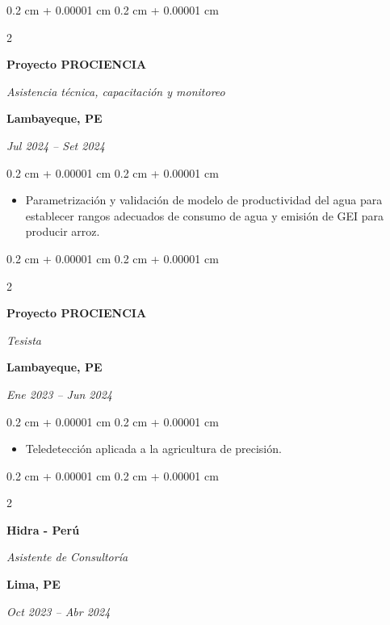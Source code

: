 \documentclass[10pt, letterpaper]{article}
\newenvironment{highlights}{
    \begin{itemize}[
        topsep=0.10 cm,
        parsep=0.10 cm,
        partopsep=0pt,
        itemsep=0pt,
        leftmargin=0.4 cm + 10pt
    ]
}{
    \end{itemize}
} %
\newenvironment{onecolentry}{
    \begin{adjustwidth}{
        0.2 cm + 0.00001 cm
    }{
        0.2 cm + 0.00001 cm
    }
}{
    \end{adjustwidth}
} %
\newenvironment{twocolentry}[2][]{
    \onecolentry
    \def\secondColumn{#2}
    \setcolumnwidth{\fill, 4.5 cm}
    \begin{paracol}{2}
}{
    \switchcolumn \raggedleft \secondColumn
    \end{paracol}
    \endonecolentry
} %
\begin{document}
        \vspace{0.2 cm}

        \begin{twocolentry}{
        \textbf{Lambayeque, PE}    
            
        \textit{Jul 2024 – Set 2024}}
            \textbf{Proyecto PROCIENCIA}

            \textit{Asistencia técnica, capacitación y monitoreo}
        \end{twocolentry}

        \vspace{0.10 cm}
        \begin{onecolentry}
            \begin{highlights}
                \item Parametrización y validación de modelo de productividad del agua para establecer rangos adecuados de consumo de agua y emisión de GEI para producir arroz.
            \end{highlights}
        \end{onecolentry}


        \vspace{0.2 cm}

        \begin{twocolentry}{
        \textbf{Lambayeque, PE}    
            
        \textit{Ene 2023 – Jun 2024}}
            \textbf{Proyecto PROCIENCIA}
            
            \textit{Tesista}
        \end{twocolentry}

        \vspace{0.10 cm}
        \begin{onecolentry}
            \begin{highlights}
                \item Teledetección aplicada a la agricultura de precisión.
            \end{highlights}
        \end{onecolentry}

        \vspace{0.2 cm}

        \begin{twocolentry}{
        \textbf{Lima, PE}    
            
        \textit{Oct 2023 – Abr 2024}}
            \textbf{Hidra - Perú}
            
            \textit{Asistente de Consultoría}
        \end{twocolentry}
\end{document}
